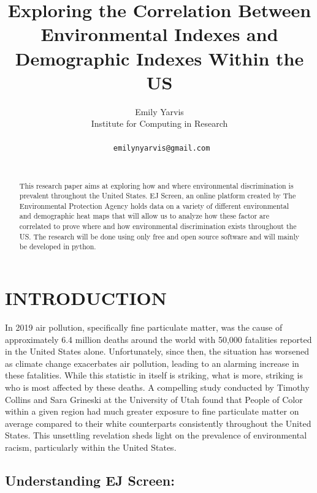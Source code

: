 \documentclass[letterpaper, 10 pt, conference]{ieeeconf}  %
\title{\LARGE \bf
Exploring the Correlation Between Environmental Indexes and Demographic Indexes Within the US
}
\author{Emily Yarvis%
\\ Institute for Computing in Research  \\
\\
{\tt\small\ emilynyarvis@gmail.com} \\ \\
}
\begin{document}
\maketitle
\thispagestyle{plain}
\pagestyle{plain}



\begin{abstract}

This research paper aims at exploring how and where environmental discrimination is prevalent throughout the United States. EJ Screen, an online platform created by The Environmental Protection Agency holds data on a variety of different environmental and demographic heat maps that will allow us to analyze how these factor are correlated to prove where and how environmental discrimination exists throughout the US. The research will be done using only free and open source software and will mainly be developed in python.



\end{abstract}



\section{INTRODUCTION}

In 2019 air pollution, specifically fine particulate matter, was the cause of approximately 6.4 million deaths around the world with 50,000 fatalities reported in the United States alone\cite{collins2022racial}. Unfortunately, since then, the situation has worsened as climate change exacerbates air pollution, leading to an alarming increase in these fatalities. While this statistic in itself is striking, what is more, striking is who is most affected by these deaths. A compelling study conducted by Timothy Collins and Sara Grineski at the University of Utah found that People of Color within a given region had much greater exposure to fine particulate matter on average compared to their white counterparts consistently throughout the United States\cite{collins2022racial}. This unsettling revelation sheds light on the prevalence of environmental racism, particularly within the United States.\par

\subsection{Understanding EJ Screen:}
\end{document}
